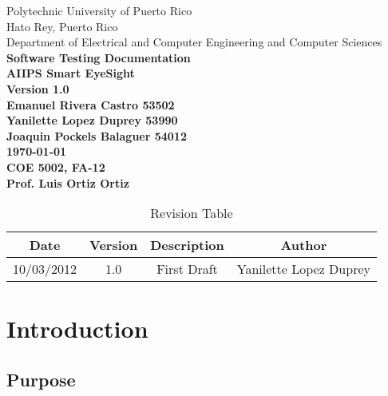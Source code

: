 \documentclass[12pt]{article}
\begin{document}
\begin{titlepage}
 \centering
 Polytechnic University of Puerto Rico\\
 Hato Rey, Puerto Rico\\
 Department of Electrical and Computer Engineering and Computer Sciences\\
    \vspace*{15\baselineskip}
    \large
    \bfseries
    Software Testing Documentation   \\
    AIIPS Smart EyeSight\\
    Version 1.0\\[3\baselineskip]
    \normalfont
     \vfill
    Emanuel Rivera Castro 53502 \\
    Yanilette Lopez Duprey 53990\\
    Joaquin Pockels Balaguer 54012\\[2\baselineskip]

    \textbf{\today} \\
    COE 5002, FA-12\\
    Prof. Luis Ortiz Ortiz\\[2\baselineskip]
\end{titlepage}

\begin{table}[H]\centering
\begin{tabular}{|c|c|c|c|}
  \hline
  Date & Version & Description & Author \\
   \hline
   10/03/2012 & 1.0 & First Draft & Yanilette Lopez Duprey \\
   \hline
\end{tabular}
\caption{Revision Table}
\end{table}
\pagebreak
\tableofcontents
\pagebreak
\listoftables
\pagebreak
\clearpage{}

\section{Introduction}

\subsection{Purpose}
\end{document}
